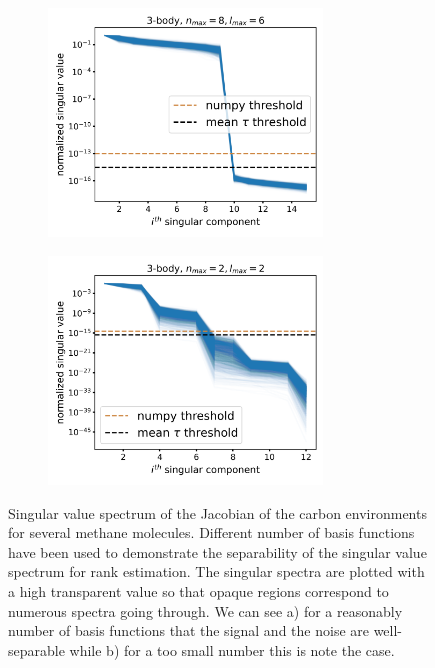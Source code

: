 \begin{figure}
    \centering
    \begin{subfigure}[b]{0.49\textwidth}
        \centering
        \includegraphics[width=0.8\textwidth]{fig/symmetry_sval_line-ps-nmax8-lmax6.png}
        \label{subfig:svals-unsupervised-separation-large}
        \caption{}
    \end{subfigure}
    \begin{subfigure}[b]{0.49\textwidth}
        \centering
        \includegraphics[width=0.8\textwidth]{fig/symmetry_sval_line-ps-nmax2-lmax2.png}
        \label{subfig:svals-unsupervised-separation-small}
        \caption{}
    \end{subfigure}
    \caption{
        Singular value spectrum of the Jacobian of the carbon environments for several methane molecules. Different number of basis functions have been used to demonstrate the separability of the singular value spectrum for rank estimation.
        The singular spectra are plotted with a high transparent value so that opaque regions correspond to numerous spectra going through.
        We can see a) for a reasonably number of basis functions that the signal and the noise are well-separable while b) for a too small number this is note the case. 
    }
    \label{fig:svals-unsupervised-separation}
\end{figure}

